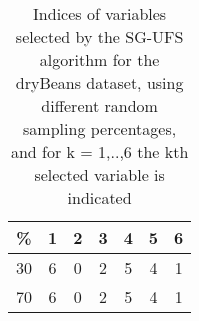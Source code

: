 \begin{table}
	\begin{center}
		\begin{tabular}{c c c c c c c}
			\% & 1 & 2 & 3 & 4 & 5 & 6 \\
			\hline
			30 & 6 & 0 & 2 & 5 & 4 & 1 \\
			70 & 6 & 0 & 2 & 5 & 4 & 1 \\
		\end{tabular}
	\end{center}
	\caption{Indices of variables selected by the SG-UFS algorithm for the dryBeans dataset, using different random sampling percentages, and for k = 1,..,6 the kth selected variable is indicated}
\end{table}